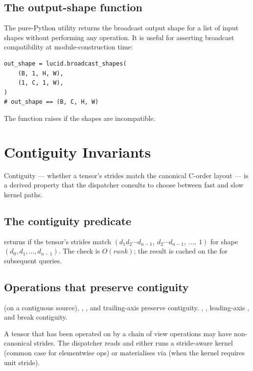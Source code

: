 \subsection{The output-shape function}
\label{ssec:shape_view:output_shape}

The pure-Python utility 
returns the broadcast output shape for a list of input shapes
without performing any operation. It is useful for asserting
broadcast compatibility at module-construction time:

\begin{lstlisting}[style=lucid,language=LucidPython]
out_shape = lucid.broadcast_shapes(
    (B, 1, H, W),
    (1, C, 1, W),
)
# out_shape == (B, C, H, W)
\end{lstlisting}

The function raises if the shapes are incompatible.

\section{Contiguity Invariants}
\label{sec:shape_view:contiguity}

Contiguity --- whether a tensor's strides match the canonical
C-order layout --- is a derived property that the dispatcher
consults to choose between fast and slow kernel paths.

\subsection{The contiguity predicate}
\label{ssec:shape_view:contig_pred}

 returns  if the tensor's
strides match $(d_1 d_2 \cdots d_{n-1},\ d_2 \cdots d_{n-1},\
\ldots,\ 1)$ for shape $(d_0, d_1, \ldots, d_{n-1})$. The check
is \(O(rank)\); the result is cached on the  for
subsequent queries.

\subsection{Operations that preserve contiguity}
\label{ssec:shape_view:contig_preserve}

 (on a contiguous source), ,
, and trailing-axis  preserve
contiguity. , , leading-axis
\code{slice}, and  break contiguity.

A tensor that has been operated on by a chain of view operations
may have non-canonical strides. The dispatcher reads
 and either runs a stride-aware kernel
(common case for elementwise ops) or materialises via
 (when the kernel requires unit stride).

